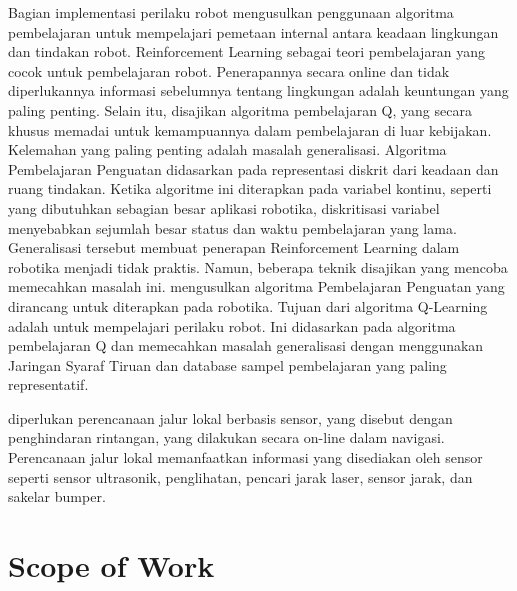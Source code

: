 Bagian  implementasi perilaku robot mengusulkan penggunaan algoritma pembelajaran untuk mempelajari pemetaan internal antara keadaan lingkungan dan tindakan robot. Reinforcement Learning sebagai teori pembelajaran yang cocok untuk pembelajaran robot. Penerapannya secara online dan tidak diperlukannya informasi sebelumnya tentang lingkungan adalah keuntungan yang paling penting. Selain itu, disajikan algoritma pembelajaran Q, yang secara khusus memadai untuk kemampuannya dalam pembelajaran di luar kebijakan. Kelemahan yang paling penting adalah masalah generalisasi. Algoritma Pembelajaran Penguatan didasarkan pada representasi diskrit dari keadaan dan ruang tindakan. Ketika algoritme ini diterapkan pada variabel kontinu, seperti yang dibutuhkan sebagian besar aplikasi robotika, diskritisasi variabel menyebabkan sejumlah besar status dan waktu pembelajaran yang lama. Generalisasi tersebut membuat penerapan Reinforcement Learning dalam robotika menjadi tidak praktis. Namun, beberapa teknik disajikan yang mencoba memecahkan masalah ini. mengusulkan algoritma Pembelajaran Penguatan yang dirancang untuk diterapkan pada robotika. Tujuan dari algoritma Q-Learning adalah untuk mempelajari perilaku robot. Ini didasarkan pada algoritma pembelajaran Q dan memecahkan masalah generalisasi dengan menggunakan Jaringan Syaraf Tiruan dan database sampel pembelajaran yang paling representatif.

diperlukan perencanaan jalur lokal berbasis sensor, yang disebut dengan penghindaran rintangan, yang dilakukan secara on-line dalam navigasi.  Perencanaan jalur lokal memanfaatkan informasi yang disediakan oleh sensor seperti sensor ultrasonik, penglihatan, pencari jarak laser, sensor jarak, dan sakelar bumper.


\section{Scope of Work}

